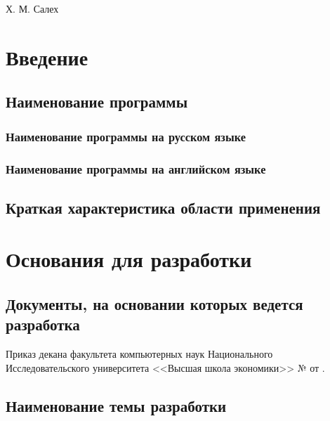 \documentclass[a4paper,12pt,reqno]{article}
\begin{document}
	
	
	
	
	

	{Х. М. Салех}
	
	\firstPage
						\newpage
	\secondPage
						\newpage
	\thirdPage
						\newpage
	\section{Введение}
	\subsection{Наименование программы}
	\subsubsection{Наименование программы на русском языке}
	{\color{red}{TODO}}
	\subsubsection{Наименование программы на английском языке}
	{\color{red}{TODO}}
	\subsection{Краткая характеристика области применения}
	
	\newpage
	\section{Основания для разработки}
	\subsection{Документы, на основании которых ведется разработка}
	
	
	Приказ декана факультета компьютерных наук Национального Исследовательского университета <<Высшая школа экономики>> № {\color{red}{TODO}} от {\color{red}{TODO}}.
	
	\subsection{Наименование темы разработки}
	
\end{document}
